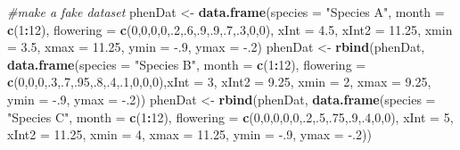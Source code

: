 \documentclass[
]{article}
\newenvironment{Shaded}{\begin{snugshade}}{\end{snugshade}}
\newcommand{\CommentTok}[1]{\textcolor[rgb]{0.56,0.35,0.01}{\textit{#1}}}
\newcommand{\DataTypeTok}[1]{\textcolor[rgb]{0.13,0.29,0.53}{#1}}
\newcommand{\DecValTok}[1]{\textcolor[rgb]{0.00,0.00,0.81}{#1}}
\newcommand{\FloatTok}[1]{\textcolor[rgb]{0.00,0.00,0.81}{#1}}
\newcommand{\KeywordTok}[1]{\textcolor[rgb]{0.13,0.29,0.53}{\textbf{#1}}}
\newcommand{\NormalTok}[1]{#1}
\newcommand{\OperatorTok}[1]{\textcolor[rgb]{0.81,0.36,0.00}{\textbf{#1}}}
\newcommand{\StringTok}[1]{\textcolor[rgb]{0.31,0.60,0.02}{#1}}
\begin{document}
\begin{Shaded}
\begin{Highlighting}[]
\CommentTok{\#make a fake dataset}
\NormalTok{phenDat \textless{}{-}}\StringTok{ }\KeywordTok{data.frame}\NormalTok{(}\DataTypeTok{species =} \StringTok{"Species A"}\NormalTok{, }\DataTypeTok{month =} \KeywordTok{c}\NormalTok{(}\DecValTok{1}\OperatorTok{:}\DecValTok{12}\NormalTok{), }\DataTypeTok{flowering =} \KeywordTok{c}\NormalTok{(}\DecValTok{0}\NormalTok{,}\DecValTok{0}\NormalTok{,}\DecValTok{0}\NormalTok{,}\DecValTok{0}\NormalTok{,.}\DecValTok{2}\NormalTok{,.}\DecValTok{6}\NormalTok{,.}\DecValTok{9}\NormalTok{,.}\DecValTok{9}\NormalTok{,.}\DecValTok{7}\NormalTok{,.}\DecValTok{3}\NormalTok{,}\DecValTok{0}\NormalTok{,}\DecValTok{0}\NormalTok{), }\DataTypeTok{xInt =} \FloatTok{4.5}\NormalTok{, }\DataTypeTok{xInt2 =} \FloatTok{11.25}\NormalTok{, }\DataTypeTok{xmin =} \FloatTok{3.5}\NormalTok{, }\DataTypeTok{xmax =} \FloatTok{11.25}\NormalTok{, }\DataTypeTok{ymin =} \FloatTok{{-}.9}\NormalTok{, }\DataTypeTok{ymax =} \FloatTok{{-}.2}\NormalTok{)}
\NormalTok{phenDat \textless{}{-}}\StringTok{ }\KeywordTok{rbind}\NormalTok{(phenDat, }\KeywordTok{data.frame}\NormalTok{(}\DataTypeTok{species =} \StringTok{"Species B"}\NormalTok{, }\DataTypeTok{month =} \KeywordTok{c}\NormalTok{(}\DecValTok{1}\OperatorTok{:}\DecValTok{12}\NormalTok{), }\DataTypeTok{flowering =} \KeywordTok{c}\NormalTok{(}\DecValTok{0}\NormalTok{,}\DecValTok{0}\NormalTok{,}\DecValTok{0}\NormalTok{,.}\DecValTok{3}\NormalTok{,.}\DecValTok{7}\NormalTok{,.}\DecValTok{95}\NormalTok{,.}\DecValTok{8}\NormalTok{,.}\DecValTok{4}\NormalTok{,.}\DecValTok{1}\NormalTok{,}\DecValTok{0}\NormalTok{,}\DecValTok{0}\NormalTok{,}\DecValTok{0}\NormalTok{),}\DataTypeTok{xInt =} \DecValTok{3}\NormalTok{, }\DataTypeTok{xInt2 =} \FloatTok{9.25}\NormalTok{, }\DataTypeTok{xmin =} \DecValTok{2}\NormalTok{, }\DataTypeTok{xmax =} \FloatTok{9.25}\NormalTok{, }\DataTypeTok{ymin =} \FloatTok{{-}.9}\NormalTok{, }\DataTypeTok{ymax =} \FloatTok{{-}.2}\NormalTok{))}
\NormalTok{phenDat \textless{}{-}}\StringTok{ }\KeywordTok{rbind}\NormalTok{(phenDat, }\KeywordTok{data.frame}\NormalTok{(}\DataTypeTok{species =} \StringTok{"Species C"}\NormalTok{, }\DataTypeTok{month =} \KeywordTok{c}\NormalTok{(}\DecValTok{1}\OperatorTok{:}\DecValTok{12}\NormalTok{), }\DataTypeTok{flowering =} \KeywordTok{c}\NormalTok{(}\DecValTok{0}\NormalTok{,}\DecValTok{0}\NormalTok{,}\DecValTok{0}\NormalTok{,}\DecValTok{0}\NormalTok{,}\DecValTok{0}\NormalTok{,.}\DecValTok{2}\NormalTok{,.}\DecValTok{5}\NormalTok{,.}\DecValTok{75}\NormalTok{,.}\DecValTok{9}\NormalTok{,.}\DecValTok{4}\NormalTok{,}\DecValTok{0}\NormalTok{,}\DecValTok{0}\NormalTok{), }\DataTypeTok{xInt =} \DecValTok{5}\NormalTok{, }\DataTypeTok{xInt2 =} \FloatTok{11.25}\NormalTok{, }\DataTypeTok{xmin =} \DecValTok{4}\NormalTok{, }\DataTypeTok{xmax =} \FloatTok{11.25}\NormalTok{, }\DataTypeTok{ymin =} \FloatTok{{-}.9}\NormalTok{, }\DataTypeTok{ymax =} \FloatTok{{-}.2}\NormalTok{))}


\end{Highlighting}
\end{Shaded}
\end{document}
